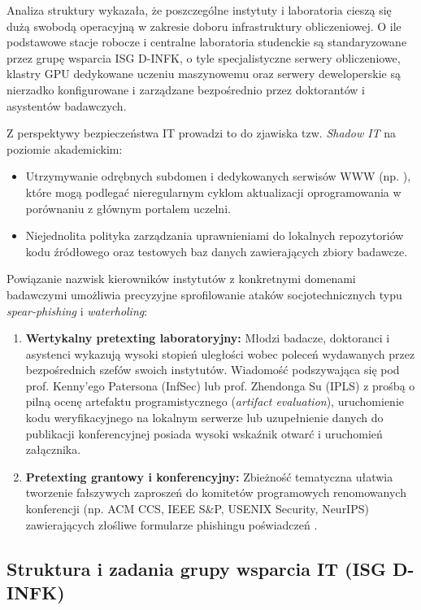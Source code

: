 Analiza struktury wykazała, że poszczególne instytuty i laboratoria cieszą się dużą swobodą operacyjną w zakresie doboru infrastruktury obliczeniowej. O ile podstawowe stacje robocze i centralne laboratoria studenckie są standaryzowane przez grupę wsparcia ISG D-INFK, o tyle specjalistyczne serwery obliczeniowe, klastry GPU dedykowane uczeniu maszynowemu oraz serwery deweloperskie są nierzadko konfigurowane i zarządzane bezpośrednio przez doktorantów i asystentów badawczych.

Z perspektywy bezpieczeństwa IT prowadzi to do zjawiska tzw. \textit{Shadow IT} na poziomie akademickim:
\begin{itemize}
    \item Utrzymywanie odrębnych subdomen i dedykowanych serwisów WWW (np. ), które mogą podlegać nieregularnym cyklom aktualizacji oprogramowania w porównaniu z głównym portalem uczelni.
    \item Niejednolita polityka zarządzania uprawnieniami do lokalnych repozytoriów kodu źródłowego oraz testowych baz danych zawierających zbiory badawcze.
\end{itemize}


Powiązanie nazwisk kierowników instytutów z konkretnymi domenami badawczymi umożliwia precyzyjne sprofilowanie ataków socjotechnicznych typu \textit{spear-phishing} i \textit{waterholing}:
\begin{enumerate}
    \item \textbf{Wertykalny pretexting laboratoryjny:} Młodzi badacze, doktoranci i asystenci wykazują wysoki stopień uległości wobec poleceń wydawanych przez bezpośrednich szefów swoich instytutów. Wiadomość podszywająca się pod prof. Kenny'ego Patersona (InfSec) lub prof. Zhendonga Su (IPLS) z prośbą o pilną ocenę artefaktu programistycznego (\textit{artifact evaluation}), uruchomienie kodu weryfikacyjnego na lokalnym serwerze lub uzupełnienie danych do publikacji konferencyjnej posiada wysoki wskaźnik otwarć i uruchomień załącznika.
    \item \textbf{Pretexting grantowy i konferencyjny:} Zbieżność tematyczna ułatwia tworzenie fałszywych zaproszeń do komitetów programowych renomowanych konferencji (np. ACM CCS, IEEE S\&P, USENIX Security, NeurIPS) zawierających złośliwe formularze phishingu poświadczeń .
\end{enumerate}

\subsection{Struktura i zadania grupy wsparcia IT (ISG D-INFK)}\label{subsec:administracja-isg}

